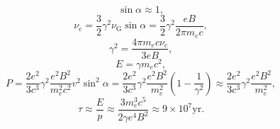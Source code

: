 \documentclass[12pt]{ctexart}
\begin{document}
\begin{equation*}
    \sin\alpha\approx 1,
\end{equation*}
\begin{equation*}
    \nu_\text{c}
    =\frac{3}{2}\gamma^2\nu_\text{G}\sin\alpha
    =\frac{3}{2}\gamma^2\frac{eB}{2\pi m_ec},
\end{equation*}
\begin{equation*}
    \gamma^2=\frac{4\pi m_ec\nu_\text{c}}{3eB},
\end{equation*}
\begin{equation*}
    E=\gamma m_ec^2,
\end{equation*}
\begin{equation*}
    P=\frac{2e^2}{3c^3}\gamma^2\frac{e^2B^2}{m_e^2c^2}v^2\sin^2\alpha
    =\frac{2e^2}{3c^3}\gamma^2\frac{e^2B^2}{m_e^2}\left(1-\frac{1}{\gamma^2}\right)
    \approx\frac{2e^2}{3c^3}\gamma^2\frac{e^2B^2}{m_e^2},
\end{equation*}
\begin{equation*}
    \tau\approx\frac{E}{p}\approx\frac{3m_e^3c^5}{2\gamma e^4B^2}\approx9\times10^7\text{yr}.
\end{equation*}
\end{document}
